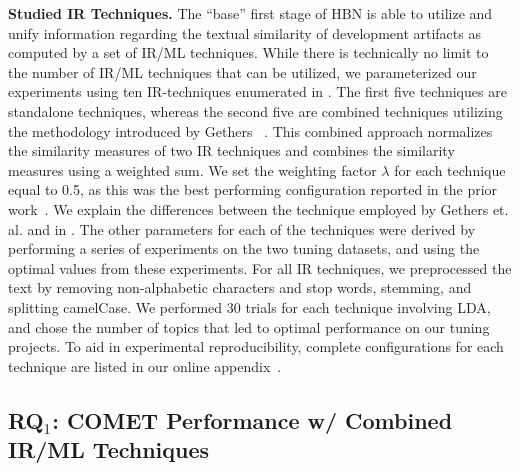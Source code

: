 \textbf{Studied IR Techniques.} The ``base'' first stage of \Comets HBN is able to utilize and unify information regarding the textual similarity of development artifacts as computed by a set of IR/ML techniques.  While there is technically no limit to the number of IR/ML techniques that can be utilized, we parameterized our experiments using ten IR-techniques enumerated in . The first five techniques are standalone techniques, whereas the second five are combined techniques utilizing the methodology introduced by Gethers \etal~\citep{Gethers:ICSM'11}. This combined approach normalizes the similarity measures of two IR techniques and combines the similarity measures using a weighted sum. We set the weighting factor $\lambda$ for each technique equal to 0.5, as this was the best performing configuration reported in the prior work~\citep{Gethers:ICSM'11}. We explain the differences between the technique employed by Gethers et. al. and \Comet in . The other parameters for each of the techniques were derived by performing a series of experiments on the two tuning datasets, and using the optimal values from these experiments. For all IR techniques, we preprocessed the text by removing non-alphabetic characters and stop words, stemming, and splitting camelCase. We performed 30 trials for each technique involving LDA, and chose the number of topics that led to optimal performance on our tuning projects. To aid in experimental reproducibility, complete configurations for each technique are listed in our online appendix~\citep{appendix}.




\subsection{RQ$_1$: C{\footnotesize OMET} Performance w/ Combined IR/ML Techniques}
\label{sub:study-rq1}

